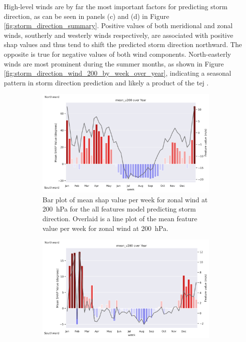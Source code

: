 High-level winds are by far the most important factors for predicting storm direction, as can be seen in panels (c) and (d) in Figure \ref{fig:storm_direction_summary}. Positive values of both meridional and zonal winds, southerly and westerly winds respectively, are associated with positive \acrshort{shap} values and thus tend to shift the predicted storm direction northward. The opposite is true for negative values of both wind components. North-easterly winds are most prominent during the summer months, as shown in Figure \ref{fig:storm_direction_wind_200_by_week_over_year}, indicating a seasonal pattern in storm direction prediction and likely a product of the \acrfull{tej} \citep{Vashisht2021}.

\begin{figure}[ht]
    \centering
    \begin{subfigure}[t]{\textwidth}
        \centering
        \includegraphics[width=\textwidth]{../figures/generated/experiments/storm_direction/temporal_corr/storm_direction_all_shap_mean_u200_by_week_over_year.png}
        \caption{Bar plot of mean \acrshort{shap} value per week for zonal wind at \SI{200}{\hecto\pascal} for the all features model predicting storm direction. Overlaid is a line plot of the mean feature value per week for zonal wind at \SI{200}{\hecto\pascal}.}
        \label{fig:storm_direction_all_shap_mean_u200_by_week_over_year}
    \end{subfigure}
    \vspace{1em}
    \begin{subfigure}[t]{\textwidth}
        \centering
        \includegraphics[width=\textwidth]{../figures/generated/experiments/storm_direction/temporal_corr/storm_direction_all_shap_mean_v200_by_week_over_year.png}

\end{subfigure}
\end{figure}
